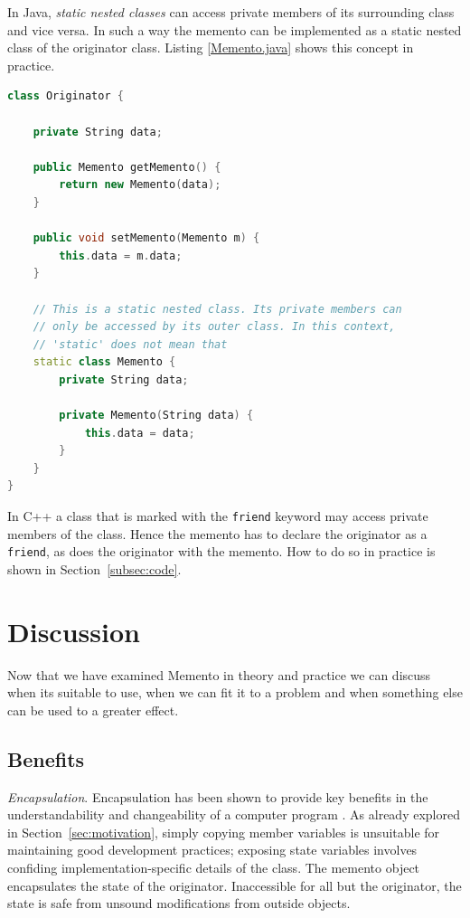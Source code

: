\documentclass[11pt, a4paper, twoside]{article}
\begin{document}
	In Java, \emph{static nested classes} can access private members of its surrounding class and vice versa. In such a way the memento can be implemented as a static nested class of the originator class. Listing \ref{Memento.java} shows this concept in practice.
	
		\begin{lstlisting}[language=c++, caption={Memento.java}, label={Memento.java}]
class Originator {
	
	private String data;
	
	public Memento getMemento() {
		return new Memento(data);
	}
	
	public void setMemento(Memento m) {
		this.data = m.data;
	}
	
	// This is a static nested class. Its private members can
	// only be accessed by its outer class. In this context,
	// 'static' does not mean that
	static class Memento {
		private String data;
	
		private Memento(String data) {
			this.data = data;
		}
	}
}
		\end{lstlisting}
	
	In C++ a class that is marked with the \verb|friend| keyword may access private members of the class. Hence the memento has to declare the originator as a \verb|friend|, as does the originator with the memento. How to do so in practice is shown in Section~\ref{subsec:code}.
	
	\section{Discussion}
	Now that we have examined Memento in theory and practice we can discuss when its suitable to use, when we can fit it to a problem and when something else can be used to a greater effect.
	
	
	\subsection{Benefits}
	\label{sec:benefits}
	\emph{Encapsulation}. Encapsulation has been shown to provide key benefits in the understandability and changeability of a computer program \cite{snyder1986}. As already explored in Section~\ref{sec:motivation}, simply copying member variables is unsuitable for maintaining good development practices; exposing state variables involves confiding implementation-specific details of the class. The memento object encapsulates the state of the originator. Inaccessible for all but the originator, the state is safe from unsound modifications from outside objects. \\
	
\end{document}
